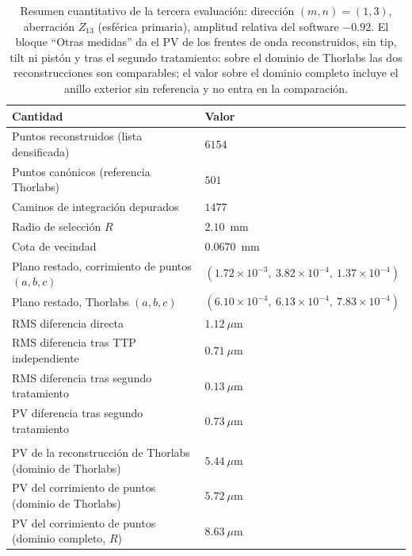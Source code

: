 \documentclass[letterpaper,12pt,oneside]{book}
\begin{document}
\begin{table}[htbp]
\centering
\caption{Resumen cuantitativo de la tercera evaluación: dirección $(m,n)=(1,3)$,
aberración $Z_{13}$ (esférica primaria), amplitud relativa del software $-0.92$. El
bloque ``Otras medidas'' da el PV de los frentes de onda reconstruidos, sin tip, tilt ni
pistón y tras el segundo tratamiento: sobre el dominio de Thorlabs las dos
reconstrucciones son comparables; el valor sobre el dominio completo incluye el anillo
exterior sin referencia y no entra en la comparación.}
\label{tab:cap5-resumen-eval3}
\small
\begin{tabularx}{\textwidth}{>{\raggedright\arraybackslash}Xl}
\hline
\textbf{Cantidad} & \textbf{Valor} \\
\hline
Puntos reconstruidos (lista densificada) & $6154$ \\
Puntos canónicos (referencia Thorlabs)   & $501$ \\
Caminos de integración depurados         & $1477$ \\
Radio de selección $R$                   & $2.10$~mm \\
Cota de vecindad                         & $0.0670$~mm \\
\hline
Plano restado, corrimiento de puntos $(a, b, c)$ & $(1.72\times 10^{-3},\ 3.82\times 10^{-4},\ 1.37\times 10^{-4})$ \\
Plano restado, Thorlabs $(a, b, c)$              & $(6.10\times 10^{-4},\ 6.13\times 10^{-4},\ 7.83\times 10^{-4})$ \\
\hline
RMS diferencia directa                          & $1.12~\mu$m \\
RMS diferencia tras TTP independiente       & $0.71~\mu$m \\
RMS diferencia tras segundo tratamiento     & $0.13~\mu$m \\
PV diferencia tras segundo tratamiento      & $0.73~\mu$m \\
\hline
\multicolumn{2}{l}{\textit{Otras medidas: PV de los frentes de onda reconstruidos}} \\
PV de la reconstrucción de Thorlabs (dominio de Thorlabs) & $5.44~\mu$m \\
PV del corrimiento de puntos (dominio de Thorlabs)        & $5.72~\mu$m \\
PV del corrimiento de puntos (dominio completo, $R$)         & $8.63~\mu$m \\
\hline
\end{tabularx}
\end{table}
\end{document}
